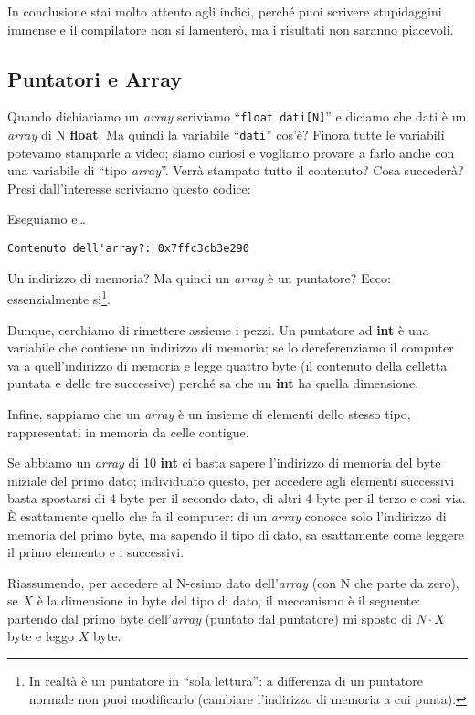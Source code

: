 In conclusione stai molto attento agli indici, perché puoi scrivere stupidaggini immense e il compilatore non si lamenterò, ma i risultati non saranno piacevoli.

\subsection{Puntatori e Array}
 Quando dichiariamo un \emph{array} scriviamo ``\lstinline|float dati[N]|'' e diciamo che dati è un \emph{array} di N \textbf{float}. Ma quindi la variabile ``\verb|dati|'' cos'è? Finora tutte le variabili potevamo stamparle a video; siamo curiosi e vogliamo provare a farlo anche con una variabile di ``tipo \emph{array}''. Verrà stampato tutto il contenuto? Cosa succederà? Presi dall'interesse scriviamo questo codice:

Eseguiamo e\ldots
\begin{shaded}
	\verb|Contenuto dell'array?: 0x7ffc3cb3e290|
\end{shaded}
Un indirizzo di memoria? Ma quindi un \emph{array} è un puntatore? Ecco: essenzialmente si\footnote{In realtà è un puntatore in ``sola lettura'': a differenza di un puntatore normale non puoi modificarlo (cambiare l'indirizzo di memoria a cui punta).}.

Dunque, cerchiamo di rimettere assieme i pezzi. Un puntatore ad \textbf{int} è una variabile che contiene un indirizzo di memoria; se lo dereferenziamo il computer va a quell'indirizzo di memoria e legge quattro byte (il contenuto della celletta puntata e delle tre successive) perché sa che un \textbf{int} ha quella dimensione.  

Infine, sappiamo che un \emph{array} è un insieme di elementi dello stesso tipo, rappresentati in memoria da celle contigue. 

Se abbiamo un \emph{array} di 10 \textbf{int} ci basta sapere l'indirizzo di memoria del byte iniziale del primo dato; individuato questo, per accedere agli elementi successivi basta spostarsi di 4 byte per il secondo dato, di altri 4 byte per il terzo e così via. È esattamente quello che fa il computer: di un \emph{array} conosce solo l'indirizzo di memoria del primo byte, ma sapendo il tipo di dato, sa esattamente come leggere il primo elemento e i successivi.

Riassumendo, per accedere al N-esimo dato dell'\emph{array} (con N che parte da zero), se $X$ è la dimensione in byte del tipo di dato, il meccanismo è il seguente: partendo dal primo byte dell'\emph{array} (puntato dal puntatore) mi  sposto di $N\cdot X$ byte e leggo $X$ byte.\\

